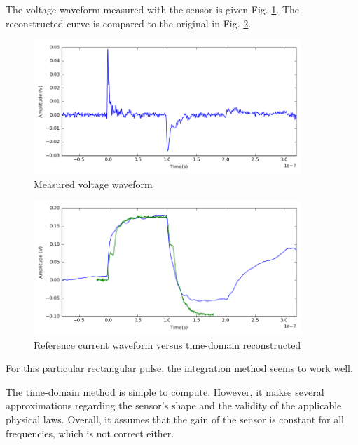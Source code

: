 The voltage waveform measured with the sensor is given Fig. \ref{fig:measurement-nfs}.
The reconstructed curve is compared to the original in Fig. \ref{fig:time-domain-reconstructed}.

\begin{figure}[!htbp]
  \centering
  \includegraphics[width=0.9\textwidth]{src/3/figures/measured_waveform.png}
  \caption{Measured voltage waveform}
  \label{fig:measurement-nfs}
\end{figure}


\begin{figure}[!htbp]
  \centering
  \includegraphics[width=0.9\textwidth]{src/3/figures/time_domain_vs_ref.png}
  \caption{Reference current waveform versus time-domain reconstructed}
  \label{fig:time-domain-reconstructed}
\end{figure}

For this particular rectangular pulse, the integration method seems to work well.

The time-domain method is simple to compute.
However, it makes several approximations regarding the sensor's shape and the validity of the applicable physical laws.
Overall, it assumes that the gain of the sensor is constant for all frequencies, which is not correct either.

